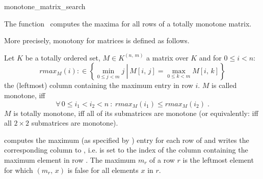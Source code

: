 
\cgalColumnLayout

\begin{ccRefFunction}{monotone_matrix_search}

  \begin{ccAdvanced}
    \ccDefinition The function \ccRefName\ computes the maxima for all
    rows of a totally monotone matrix.
    
    More precisely, monotony for matrices is defined as follows.
    
    Let $K$ be a totally ordered set, $M \in K^{(n,\, m)}$
      a matrix over $K$ and for $0 \le i < n$:
      $$
      rmax_M(i) :\in \left\{ \min_{0 \le j < m} j \: \left|\:
          M[i,\, j] = \max_{0 \le k < m} M[i,\, k] \right.\right\}
      $$
      the (leftmost) column containing the maximum entry in row
      $i$.  $M$ is called monotone, iff
      $$
      \forall\, 0 \le i_1 < i_2 < n\: :\: rmax_M(i_1) \le
      rmax_M(i_2)\; .
      $$
      $M$ is totally monotone, iff all of its submatrices are
      monotone (or equivalently: iff all $2 \times 2$ submatrices are
      monotone).
    

    \def\ccLongParamLayout{\ccTrue} 
    
    
    computes the maximum (as specified by )
    entry for each row of  and writes the corresponding column
    to , i.e.  is set to the index of the column
    containing the maximum element in row . The maximum $m_r$
    of a row $r$ is the leftmost element for which
    $(m_r,\,x)$ is false for all elements $x$ in
    $r$.
    

\end{ccAdvanced}
\end{ccRefFunction}
